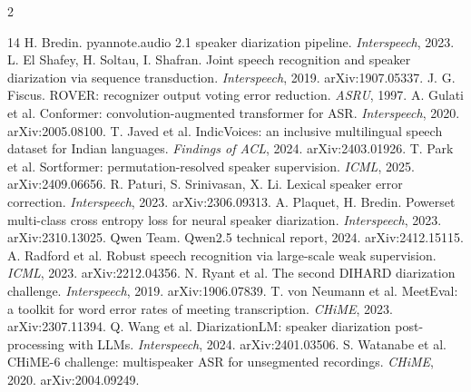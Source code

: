 \documentclass[10pt]{article}
\begin{document}
{\scriptsize
\setlength{\columnsep}{14pt}
\begin{multicols}{2}
\begin{thebibliography}{14}\setlength{\itemsep}{0pt}\setlength{\parskip}{0pt}
 H. Bredin. pyannote.audio 2.1 speaker diarization pipeline. \emph{Interspeech}, 2023.
 L. El Shafey, H. Soltau, I. Shafran. Joint speech recognition and speaker diarization via sequence transduction. \emph{Interspeech}, 2019. arXiv:1907.05337.
 J. G. Fiscus. ROVER: recognizer output voting error reduction. \emph{ASRU}, 1997.
 A. Gulati et al. Conformer: convolution-augmented transformer for ASR. \emph{Interspeech}, 2020. arXiv:2005.08100.
 T. Javed et al. IndicVoices: an inclusive multilingual speech dataset for Indian languages. \emph{Findings of ACL}, 2024. arXiv:2403.01926.
 T. Park et al. Sortformer: permutation-resolved speaker supervision. \emph{ICML}, 2025. arXiv:2409.06656.
 R. Paturi, S. Srinivasan, X. Li. Lexical speaker error correction. \emph{Interspeech}, 2023. arXiv:2306.09313.
 A. Plaquet, H. Bredin. Powerset multi-class cross entropy loss for neural speaker diarization. \emph{Interspeech}, 2023. arXiv:2310.13025.
 Qwen Team. Qwen2.5 technical report, 2024. arXiv:2412.15115.
 A. Radford et al. Robust speech recognition via large-scale weak supervision. \emph{ICML}, 2023. arXiv:2212.04356.
 N. Ryant et al. The second DIHARD diarization challenge. \emph{Interspeech}, 2019. arXiv:1906.07839.
 T. von Neumann et al. MeetEval: a toolkit for word error rates of meeting transcription. \emph{CHiME}, 2023. arXiv:2307.11394.
 Q. Wang et al. DiarizationLM: speaker diarization post-processing with LLMs. \emph{Interspeech}, 2024. arXiv:2401.03506.
 S. Watanabe et al. CHiME-6 challenge: multispeaker ASR for unsegmented recordings. \emph{CHiME}, 2020. arXiv:2004.09249.
\end{thebibliography}
\end{multicols}
}
\end{document}
